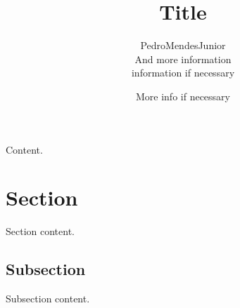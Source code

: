 



\title{Title}
\author{\gls{PedroMendesJunior}\\%
  And more information\\%
  information if necessary\\%
}
\date{More info if necessary}




\maketitle

Content.

\section*{Section}

Section content.

\subsection*{Subsection}

Subsection content.




